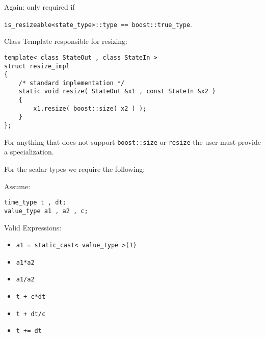 \begin{frame}[fragile]
Again: only required if \\
\centerline{\lstinline+is_resizeable<state_type>::type == boost::true_type+.}
\vspace{0.5em}

Class Template responsible for resizing:
\begin{lstlisting}
template< class StateOut , class StateIn >
struct resize_impl
{
    /* standard implementation */
    static void resize( StateOut &x1 , const StateIn &x2 )
    {
        x1.resize( boost::size( x2 ) );
    }
};
\end{lstlisting}

For anything that does not support \lstinline+boost::size+ or \lstinline+resize+ the user must provide a specialization.

\end{frame}


\begin{frame}[fragile]

For the scalar types we require the following:

Assume:
\begin{lstlisting}
time_type t , dt;
value_type a1 , a2 , c;
\end{lstlisting}

Valid Expressions:
\begin{itemize}
 \item \lstinline+a1 = static_cast< value_type >(1)+
 \item \lstinline+a1*a2+
 \item \lstinline+a1/a2+
 \item \lstinline!t + c*dt!
 \item \lstinline!t + dt/c!
 \item \lstinline!t += dt!
\end{itemize}

\end{frame}


\begin{frame}[fragile]

\end{frame}
